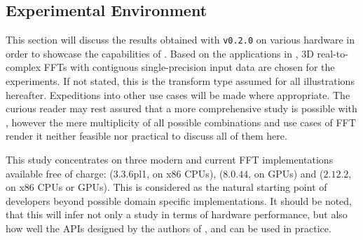 \subsection{Experimental Environment}
\label{ssec:env}

This section will discuss the results obtained with \gearshifft{} \texttt{v0.2.0} on various hardware in order to showcase the capabilities of \gearshifft{}. Based on the applications in \cite{preibisch2014efficient, schmid2015real}, 3D real-to-complex FFTs with contiguous single-precision input data are chosen for the experiments. If not stated, this is the transform type assumed for all illustrations hereafter.
%
Expeditions into other use cases will be made where appropriate. The curious reader may rest assured that a more comprehensive study is possible with \gearshifft{}, however the mere multiplicity of all possible combinations and use cases of FFT render it neither feasible nor practical to discuss all of them here.

This study concentrates on three modern and current FFT implementations available free of charge: \fftw{} ($3.3.6$pl1, on x86 CPUs), \cufft{} ($8.0.44$, on \nvidia{} GPUs) and \clfft{} ($2.12.2$, on x86 CPUs or \nvidia{} GPUs). This is considered as the natural starting point of developers beyond possible domain specific implementations.
It should be noted, that this will infer not only a study in terms of hardware performance, but also how well the APIs designed by the authors of \fftw{}, \clfft{} and \cufft{} can be used in practice.

